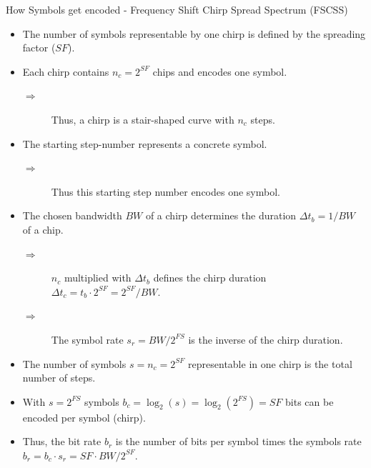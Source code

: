 \begin{frame}{How Symbols get encoded - \alert{Frequency Shift} Chirp Spread Spectrum (FSCSS)}
  \begin{itemize}
    \item The number of symbols representable by one chirp is defined by the \alert{spreading factor} ($SF$).
    \item Each chirp contains $n_c = 2^{SF}$ \alert{chips} and encodes one symbol.
    \begin{description}
      \item[$\Rightarrow$] Thus, a chirp is a \alert{stair-shaped curve} with \alert{$n_c$ steps}.
    \end{description}
    \item The \alert{starting step-number} represents a concrete symbol.
    \begin{description}
      \item[$\Rightarrow$] Thus this starting step number \alert{encodes one symbol}.
    \end{description}
    \item The chosen \alert{bandwidth $BW$ of a chirp} determines the \alert{duration} $\Delta t_b = 1 / BW$ of a \alert{chip}.
    \begin{description}
      \item[$\Rightarrow$] $n_c$ multiplied with $\Delta t_b$ defines the \alert{chirp duration} $\Delta t_c = t_b \cdot 2^{SF} = 2^{SF} / BW$.
      \item[$\Rightarrow$] The \alert{symbol rate} $s_r = BW / 2^{FS}$ is the \alert{inverse of the chirp duration}.
    \end{description}
    \item The \alert{number of symbols} $s = n_c = 2^{SF}$ \alert{representable in one} chirp is the \alert{total number of steps}.
    \item With $s = 2^{FS}$ symbols \alert{$b_c = \log_2(s) = \log_2(2^{FS})= SF$ bits} can be encoded per symbol (chirp).
    \item Thus, the \alert{bit rate} $b_r$ is the number of \alert{bits per symbol} times the \alert{symbols rate} $b_r = b_c \cdot s_r =  SF \cdot BW / 2^{SF}$.
  \end{itemize}
\end{frame}
